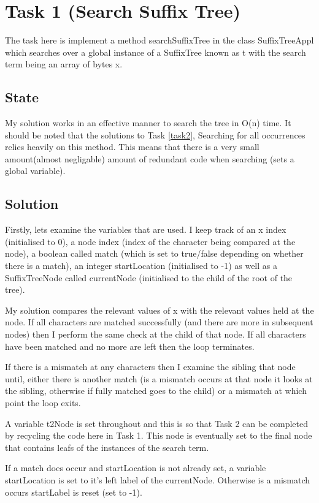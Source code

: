 \documentclass[12pt]{article} %
\begin{document}
\tableofcontents
\newpage
\section{Task 1 (Search Suffix Tree)}
The task here is implement a method searchSuffixTree in the class SuffixTreeAppl
which searches over a global instance of a SuffixTree known as t with the search
term being an array of bytes x.
\subsection{State}
My solution works in an effective manner to search the tree in O(n) time. It should be
noted that the solutions to Task \ref{task2}, Searching for all occurrences relies heavily on
this method. This means that there is a very small amount(almost negligable) amount of redundant
code when searching (sets a global variable). 
\subsection{Solution}
Firstly, lets examine the variables that are used. I keep track of an x index (initialised
to 0), a node index (index of the character being compared at the node), a boolean called match
(which is set to true/false depending on whether there is a match), an integer startLocation
(initialised to -1) as well as a SuffixTreeNode called currentNode (initialised to the child of the
root of the tree).

My solution compares the relevant values of x with the relevant values held at the node. If all
characters are matched successfully (and there are more in subsequent nodes) then I perform the
same check at the child of that node. If all characters have been matched and no more are left then
the loop terminates.

If there is a mismatch at any characters then I examine the sibling that node until, either there
is another match (is a mismatch occurs at that node it looks at the sibling, otherwise if fully
matched goes to the child) or a mismatch at which point the loop exits.

A variable t2Node is set throughout and this is so that Task 2 can be completed by recycling the
code here in Task 1. This node is eventually set to the final node that contains leafs of the
instances of the search term.

If a match does occur and startLocation is not already set, a variable startLocation is set to it's
left label of the currentNode. Otherwise is a mismatch occurs startLabel is reset (set to -1).
\end{document}
